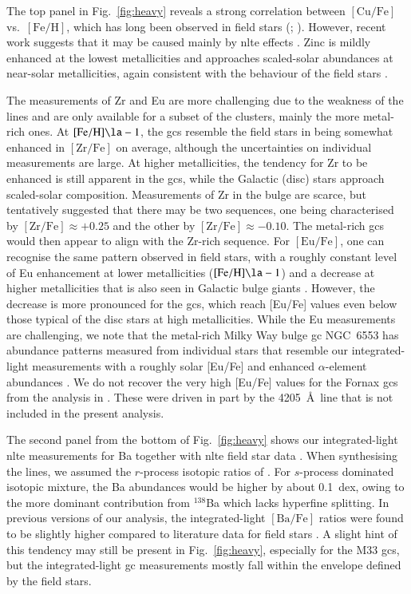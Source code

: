 \documentclass{aa}
\begin{document}
The top panel in Fig.~\ref{fig:heavy} reveals a strong correlation between $\mathrm{[Cu/Fe]}$ vs.\ $\mathrm{[Fe/H]}$, which has long been observed in field stars (\citealt{Sneden1991a}; ). However, recent work suggests that it may be caused mainly by \ac{nlte} effects \citep{Andrievsky2018}.
Zinc is mildly enhanced at the lowest metallicities and approaches scaled-solar abundances at near-solar metallicities, again consistent with the behaviour of the field stars \citep{Bensby2017,DaSilveira2018}. 

The measurements of Zr and Eu are more challenging due to the weakness of the lines and are only available for a subset of the clusters, mainly the more metal-rich ones. 
At $\mathrm{[Fe/H]}\la-1$, the \acp{gc} resemble the field stars in being somewhat enhanced in $\mathrm{[Zr/Fe]}$ on average, although the uncertainties on individual measurements are large.  At higher metallicities, the tendency for Zr to be enhanced is still apparent in the \acp{gc}, while the Galactic (disc) stars approach scaled-solar composition. Measurements of Zr in the bulge are scarce, but \citet{Johnson2012b} tentatively suggested that there may be two sequences, one being characterised by $\mathrm{[Zr/Fe]}\approx+0.25$ and the other by $\mathrm{[Zr/Fe]}\approx-0.10$. The metal-rich \acp{gc} would then appear to align with the Zr-rich sequence. 
For $\mathrm{[Eu/Fe]}$, one can recognise the same pattern observed in field stars, with a roughly constant level of Eu enhancement at lower metallicities ($\mathrm{[Fe/H]} \la -1$) and a decrease at higher metallicities that is also seen in Galactic bulge giants \citep{Johnson2012b,VanderSwaelmen2016}.
However, the decrease is more pronounced for the \acp{gc}, which reach [Eu/Fe] values even below those typical of the disc stars at high metallicities. While the Eu measurements are challenging, we note that the metal-rich Milky Way bulge \ac{gc} NGC~6553 has abundance patterns measured from individual stars that resemble our integrated-light measurements with a roughly solar [Eu/Fe] and enhanced $\alpha$-element abundances \citep{Barbuy1999,Alves-Brito2006}.
We do not recover the very high [Eu/Fe] values for the Fornax \acp{gc} from the analysis in \citet{Larsen2012a}. These were driven in part by the  4205~\AA\ line that is not included in the present analysis. 

The second panel from the bottom of Fig.~\ref{fig:heavy} shows our integrated-light \ac{nlte} measurements for Ba together with \ac{nlte} field star data \citep{Mashonkina2017,Mishenina2017,Zhao2016}. When synthesising the  lines, we assumed the $r$-process isotopic ratios of \citet{McWilliam1998}. For $s$-process dominated isotopic mixture, the Ba abundances would be higher by about 0.1~dex, owing to the more dominant contribution from $^{138}$Ba which lacks hyperfine splitting. 
In previous versions of our analysis, the integrated-light $\mathrm{[Ba/Fe]}$ ratios were found to be slightly higher compared to literature data for field stars \citep{Larsen2014,Larsen2018}. A slight hint of this tendency may still be present in Fig.~\ref{fig:heavy}, especially for the M33 \acp{gc}, but the integrated-light \ac{gc} measurements mostly fall within the envelope defined by the field stars. 
\end{document}
